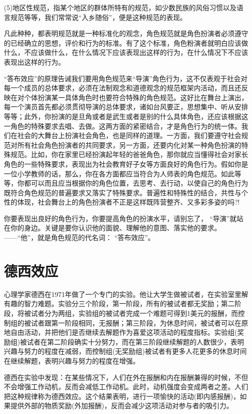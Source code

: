 \documentclass[11pt]{ctexart}
\begin{document}
(5)地区性规范，指某个地区的群体所特有的规范，如少数民族的风俗习惯以及语言规范等等，我们常常说“入乡随俗”，便是这种规范的表现。

凡此种种，都表明规范就是一种标准化的观念，角色规范就是角色扮演者必须遵守的已经确立的思想，评价和行为的标准。有了这个标准，角色粉演者就明白应该做什么，不应该做什么，在什么情况下应该表现出这样的行为，在什么情况下不应该表现出这样的行为。

“答布效应”的原理告诫我们要用角色规范来“导演”角色行为，这不仅表观于社会对每一个成员的总体要求，必须在法制观念和道德观念的规范框架内活动，而且还反映在对个体扮演某一具体角色时也要符合特殊的角色规范。这好比在舞台上演出，每一个演员首先都必须贯彻导演的总体要求，诸如台风要正，思想集中、听从安排等等；此外，你扮演的是旦角或者是武生或者是别的什么具体角色，还应该根据这一角色的特殊要求去唱、去做。这两方面的紧密结合，才是角色行为的统一体。我们在社会的大舞台上扮演社会角色，也是同样的道理。一方面，我们要遵守社会规范对所有社会角色扮演者的共同要求，另一方面，还要内化对某一种角色扮演的特殊规范。比如，你在家里已经扮演起年轻的爸爸角色，那你就应当懂得社会对家长角色的一些特殊要求，表现出为社会教育好子女等方面良好的角色行为。假如你是一位小学教师的话，那么，你在各方面都应当符合为人师表的角色规范。如此等等，你都可以而且应当根据你的角色位置，去思考、去行动，以使自己的角色行为既符合角色规范的普遍要求又落实了特殊要求。普遍性和特殊性的结合，共性与个性的体现，社会舞台上的角色扮演者不正是这样既阵营整齐、又多彩多姿的吗?!

你要表现出良好的角色行为，你要提高角色的扮演水平，请别忘了， “导演”就站在你的身边。关键是要你认识他的面貌、理解他的意图、落实他的要求。
——“他”，就是角色规范的代名词： “答布效应”。
\section{德西效应}
\label{sec-28}


心理学家德西在1971年做了一个专门的实验。他让大学生做被试者，在实验室里解有趣的智力难题。实验分三个阶段，第一阶段，所有的被试者都无奖励；第二阶段，将被试者分为两组，实验组的被试者完成一个难题可得到1美元的报酬，而控制组的被试者跟第一阶段相同，无报酬；第三阶段，为休息时间，被试者可以在原地自由活动，并把他们是否继续去解题作为喜爱这项活动的程度指标。实验组(奖励组)被试者在第二阶段确实十分努力，而在第三阶段继续解题的人数很少，表明兴趣与努力的程度在减弱，而控制组(无奖励组)被试者有更多人花更多的休息时间在继续解题，表明兴趣与努力的程度在增强。

德西在实验中发现：在某些情况下，人们在外在报酬和内在报酬兼得的时候，不但不会增强工作动机，反而会减低工作动机。此时，动机强度会变成两者之差。人们把这种规律称为德西效应。这个结果表明，进行一项愉快的活动(即内感报酬)，如果提供外部的物质奖励(外加报酬)，反而会减少这项活动对参与者的吸引力。
\end{document}
